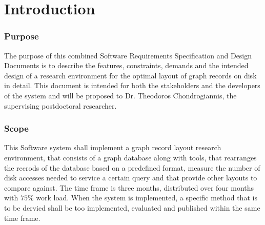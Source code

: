 \section{Introduction}
	\subsubsection{Purpose}
			The purpose of this combined Software Requirements Specification and Design Documents is to describe the features, constraints, demands and the intended design of a research environment for the optimal layout of graph records on disk in detail. This document is intended for both the stakeholders and the developers of the system and will be proposed to Dr. Theodoros Chondrogiannis, the supervising postdoctoral researcher.
	\subsubsection{Scope}
			This Software system shall implement a graph record layout research environment, that consists of a graph database along with tools, that rearranges the recrods of the database based on a predefined format, measure the number of disk accesses needed to service a certain query and that provide other layouts to compare against. The time frame is three months, distributed over four months with $75\%$ work load. When the system is implemented, a specific method that is to be dervied shall be too implemented, evaluated and published within the same time frame.

